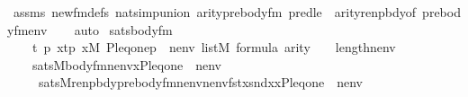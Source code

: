 \begin{isabellebody}
\ assms\ new{\isacharunderscore}{\kern0pt}fm{\isacharunderscore}{\kern0pt}defs\ nat{\isacharunderscore}{\kern0pt}simp{\isacharunderscore}{\kern0pt}union\ arity{\isacharunderscore}{\kern0pt}prebody{\isacharunderscore}{\kern0pt}fm\ pred{\isacharunderscore}{\kern0pt}le\ \ arity{\isacharunderscore}{\kern0pt}renpbdy{\isacharbrackleft}{\kern0pt}of\ {\isachardoublequoteopen}prebody{\isacharunderscore}{\kern0pt}fm{\isacharparenleft}{\kern0pt}{\isasymphi}{\isacharcomma}{\kern0pt}env{\isacharparenright}{\kern0pt}{\isachardoublequoteclose}{\isacharbrackright}{\kern0pt}\isanewline
\ \ \isamarkupfalse%
\ auto%
\endisatagproof
{\isafoldproof}%
%
\isadelimproof
\isanewline
%
\endisadelimproof
\isanewline
{}\isamarkupfalse%
\ sats{\isacharunderscore}{\kern0pt}body{\isacharunderscore}{\kern0pt}fm{\isacharprime}{\kern0pt}{\isacharcolon}{\kern0pt}\isanewline
\ \ \isanewline
\ \ \ \ {\isachardoublequoteopen}{\isasymexists}t\ p{\isachardot}{\kern0pt}\ x{\isacharequal}{\kern0pt}{\isasymlangle}t{\isacharcomma}{\kern0pt}p{\isasymrangle}{\isachardoublequoteclose}\ {\isachardoublequoteopen}x{\isasymin}M{\isachardoublequoteclose}\ {\isachardoublequoteopen}{\isacharbrackleft}{\kern0pt}{\isasymalpha}{\isacharcomma}{\kern0pt}P{\isacharcomma}{\kern0pt}leq{\isacharcomma}{\kern0pt}one{\isacharcomma}{\kern0pt}p{\isacharcomma}{\kern0pt}{\isasymrho}{\isacharbrackright}{\kern0pt}\ {\isacharat}{\kern0pt}\ nenv\ {\isasymin}list{\isacharparenleft}{\kern0pt}M{\isacharparenright}{\kern0pt}{\isachardoublequoteclose}\ {\isachardoublequoteopen}{\isasymphi}{\isasymin}formula{\isachardoublequoteclose}\ {\isachardoublequoteopen}arity{\isacharparenleft}{\kern0pt}{\isasymphi}{\isacharparenright}{\kern0pt}\ {\isasymle}\ {}\ {\isacharhash}{\kern0pt}{\isacharplus}{\kern0pt}\ length{\isacharparenleft}{\kern0pt}nenv{\isacharparenright}{\kern0pt}{\isachardoublequoteclose}\isanewline
\ \ \isanewline
\ \ \ \ {\isachardoublequoteopen}sats{\isacharparenleft}{\kern0pt}M{\isacharcomma}{\kern0pt}body{\isacharunderscore}{\kern0pt}fm{\isacharprime}{\kern0pt}{\isacharparenleft}{\kern0pt}{\isasymphi}{\isacharcomma}{\kern0pt}nenv{\isacharparenright}{\kern0pt}{\isacharcomma}{\kern0pt}{\isacharbrackleft}{\kern0pt}x{\isacharcomma}{\kern0pt}{\isasymalpha}{\isacharcomma}{\kern0pt}P{\isacharcomma}{\kern0pt}leq{\isacharcomma}{\kern0pt}one{\isacharbrackright}{\kern0pt}\ {\isacharat}{\kern0pt}\ nenv{\isacharparenright}{\kern0pt}\ {\isasymlongleftrightarrow}\isanewline
\ \ \ \ \ sats{\isacharparenleft}{\kern0pt}M{\isacharcomma}{\kern0pt}renpbdy{\isacharparenleft}{\kern0pt}prebody{\isacharunderscore}{\kern0pt}fm{\isacharparenleft}{\kern0pt}{\isasymphi}{\isacharcomma}{\kern0pt}nenv{\isacharparenright}{\kern0pt}{\isacharcomma}{\kern0pt}nenv{\isacharparenright}{\kern0pt}{\isacharcomma}{\kern0pt}{\isacharbrackleft}{\kern0pt}fst{\isacharparenleft}{\kern0pt}x{\isacharparenright}{\kern0pt}{\isacharcomma}{\kern0pt}snd{\isacharparenleft}{\kern0pt}x{\isacharparenright}{\kern0pt}{\isacharcomma}{\kern0pt}x{\isacharcomma}{\kern0pt}{\isasymalpha}{\isacharcomma}{\kern0pt}P{\isacharcomma}{\kern0pt}leq{\isacharcomma}{\kern0pt}one{\isacharbrackright}{\kern0pt}\ {\isacharat}{\kern0pt}\ nenv{\isacharparenright}{\kern0pt}{\isachardoublequoteclose}\isanewline

\end{isabellebody}
